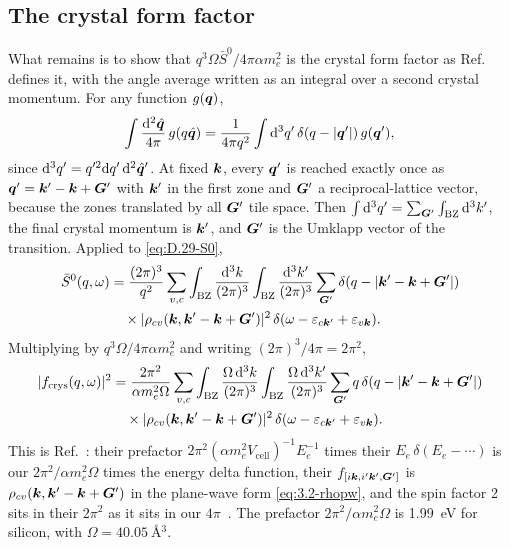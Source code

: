 \subsection{The crystal form factor}

What remains is to show that $q^3\Omega\bar S^0/4\pi\alpha m_e^2$ is the crystal form factor as Ref.~\cite[Eq.~(3.17)]{essig2016direct} defines it, with the angle average written as an integral over a second crystal momentum. For any function $g(\bm{q})$,
\begin{equation*}
  \int\frac{\mathrm{d}^2\hat{\bm{q}}}{4\pi}\,g(q\hat{\bm{q}}) = \frac{1}{4\pi q^2}\int\mathrm{d}^3q'\,\delta(q - |\bm{q}'|)\,g(\bm{q}') ,
\end{equation*}
since $\mathrm{d}^3q' = q'^2\mathrm{d} q'\,\mathrm{d}^2\hat{\bm{q}}'$. At fixed $\bm{k}$, every $\bm{q}'$ is reached exactly once as $\bm{q}' = \bm{k}' - \bm{k} + \bm{G}'$ with $\bm{k}'$ in the first zone and $\bm{G}'$ a reciprocal-lattice vector, because the zones translated by all $\bm{G}'$ tile space. Then $\int\mathrm{d}^3q' = \sum_{\bm{G}'}\int_{\mathrm{BZ}}\mathrm{d}^3k'$, the final crystal momentum is $\bm{k}'$, and $\bm{G}'$ is the Umklapp vector of the transition. Applied to \cref{eq:D.29-S0},
\begin{equation*}
  \begin{aligned}
  \bar S^0(q,\omega) &= \frac{(2\pi)^3}{q^2}\sum_{v,c}\int_{\mathrm{BZ}}\frac{\mathrm{d}^3k}{(2\pi)^3}\int_{\mathrm{BZ}}\frac{\mathrm{d}^3k'}{(2\pi)^3}\sum_{\bm{G}'}\delta(q - |\bm{k}' - \bm{k} + \bm{G}'|) \\
  &\quad\times|\rho_{cv}(\bm{k},\bm{k}'-\bm{k}+\bm{G}')|^2\,\delta(\omega - \varepsilon_{c\bm{k}'} + \varepsilon_{v\bm{k}}) .
  \end{aligned}
\end{equation*}
Multiplying by $q^3\Omega/4\pi\alpha m_e^2$ and writing $(2\pi)^3/4\pi = 2\pi^2$,
\begin{equation}
  \begin{aligned}
  |f_{\mathrm{crys}}(q,\omega)|^2 &= \frac{2\pi^2}{\alpha m_e^2\Omega}\sum_{v,c}\int_{\mathrm{BZ}}\frac{\Omega\,\mathrm{d}^3k}{(2\pi)^3}\int_{\mathrm{BZ}}\frac{\Omega\,\mathrm{d}^3k'}{(2\pi)^3}\sum_{\bm{G}'}q\,\delta(q - |\bm{k}' - \bm{k} + \bm{G}'|) \\
  &\quad\times|\rho_{cv}(\bm{k},\bm{k}'-\bm{k}+\bm{G}')|^2\,\delta(\omega - \varepsilon_{c\bm{k}'} + \varepsilon_{v\bm{k}}) .
  \end{aligned}
  \label{eq:D.29-fcrys}
\end{equation}
This is Ref.~\cite[Eq.~(3.17)]{essig2016direct}: their prefactor $2\pi^2(\alpha m_e^2V_{\mathrm{cell}})^{-1}E_e^{-1}$ times their $E_e\,\delta(E_e - \cdots)$ is our $2\pi^2/\alpha m_e^2\Omega$ times the energy delta function, their $f_{[i\bm{k},i'\bm{k}',\bm{G}']}$ is $\rho_{cv}(\bm{k},\bm{k}'-\bm{k}+\bm{G}')$ in the plane-wave form \cref{eq:3.2-rhopw}, and the spin factor 2 sits in their $2\pi^2$ as it sits in our $4\pi$~\cite[Eq.~(A.29)]{essig2016direct}. The prefactor $2\pi^2/\alpha m_e^2\Omega$ is \SI{1.99}{eV} for silicon, with $\Omega = \SI{40.05}{\angstrom^3}$.

